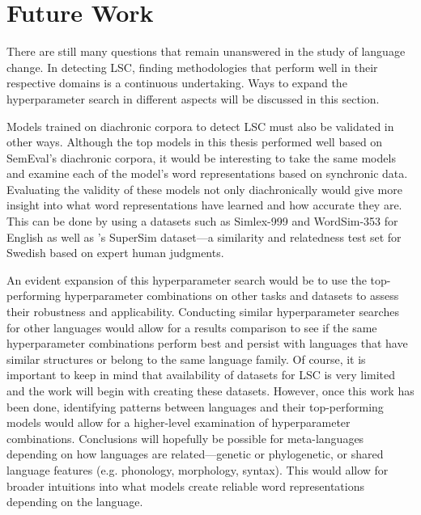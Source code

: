 \section{Future Work}
\label{sec:futurework}

There are still many questions that remain unanswered in the study of language change. In detecting LSC, finding methodologies that perform well in their respective domains is a continuous undertaking. Ways to expand the hyperparameter search in different aspects will be discussed in this section.

Models trained on diachronic corpora to detect LSC must also be validated in other ways. Although the top models in this thesis performed well based on SemEval’s diachronic corpora, it would be interesting to take the same models and examine each of the model’s word representations based on synchronic data. Evaluating the validity of these models not only diachronically would give more insight into what word representations have learned and how accurate they are. This can be done by using a datasets such as Simlex-999 \citep{hill-reichart-simlex999} and WordSim-353 \citep{finkelstein-wordsim2001} for English as well as \citet{supersim2021}'s SuperSim dataset—a similarity and relatedness test set for Swedish based on expert human judgments. 

An evident expansion of this hyperparameter search would be to use the top-performing hyperparameter combinations on other tasks and datasets to assess their robustness and applicability. Conducting similar hyperparameter searches for other languages would allow for a results comparison to see if the same hyperparameter combinations perform best and persist with languages that have similar structures or belong to the same language family. Of course, it is important to keep in mind that availability of datasets for LSC is very limited and the work will begin with creating these datasets. However, once this work has been done, identifying patterns between languages and their top-performing models would allow for a higher-level examination of hyperparameter combinations. Conclusions will hopefully be possible for meta-languages depending on how languages are related—genetic or phylogenetic, or shared language features (e.g. phonology, morphology, syntax). This would allow for broader intuitions into what models create reliable word representations depending on the language.

